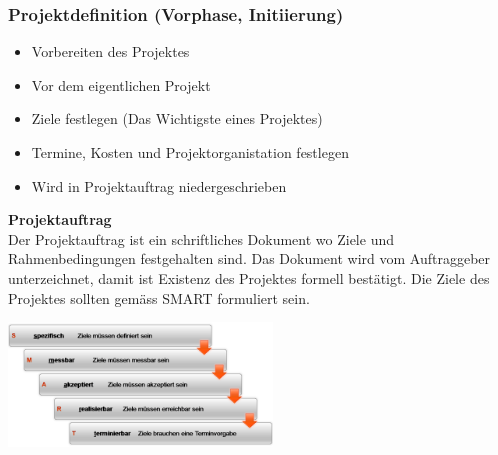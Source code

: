 \subsubsection{Projektdefinition (Vorphase, Initiierung)}
\begin{itemize}
	\item Vorbereiten des Projektes
	\item Vor dem eigentlichen Projekt
	\item Ziele festlegen (Das Wichtigste eines Projektes)
	\item Termine, Kosten und Projektorganistation festlegen
	\item Wird in Projektauftrag niedergeschrieben
\end{itemize}
	\begin{minipage}{11cm}
		\textbf{Projektauftrag} \\
		Der Projektauftrag ist ein schriftliches Dokument wo Ziele und Rahmenbedingungen festgehalten sind. Das Dokument wird vom Auftraggeber unterzeichnet, damit ist Existenz des Projektes formell bestätigt. Die Ziele des Projektes sollten gemäss SMART formuliert sein. 
	\end{minipage}
	\begin{minipage}{7cm}
		\includegraphics[width=7cm]{images/smart.png}
	\end{minipage}
	
